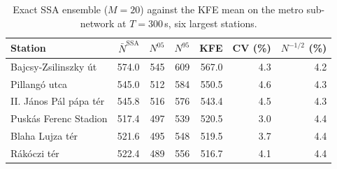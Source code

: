 \begin{table}[htbp]
\centering
\small
\begin{tabular}{lrrrrrr}
\toprule
Station & $\bar N^{\mathrm{SSA}}$ & $N^{05}$ & $N^{95}$ & KFE & CV (\%) & $N^{-1/2}$ (\%) \\
\midrule
Bajcsy-Zsilinszky \'ut & 574.0 & 545 & 609 & 567.0 & 4.3 & 4.2 \\
Pillang\'o utca & 545.0 & 512 & 584 & 550.5 & 4.6 & 4.3 \\
II. J\'anos P\'al p\'apa t\'er & 545.8 & 516 & 576 & 543.4 & 4.5 & 4.3 \\
Pusk\'as Ferenc Stadion & 517.4 & 497 & 539 & 520.5 & 3.0 & 4.4 \\
Blaha Lujza t\'er & 521.6 & 495 & 548 & 519.5 & 3.7 & 4.4 \\
R\'ak\'oczi t\'er & 522.4 & 489 & 556 & 516.7 & 4.1 & 4.4 \\
\bottomrule
\end{tabular}
\caption{Exact SSA ensemble ($M=20$) against the KFE mean on the metro sub-network at $T=300$\,s, six largest stations.}
\label{tab:ssa-kfe}
\par{}
\end{table}
